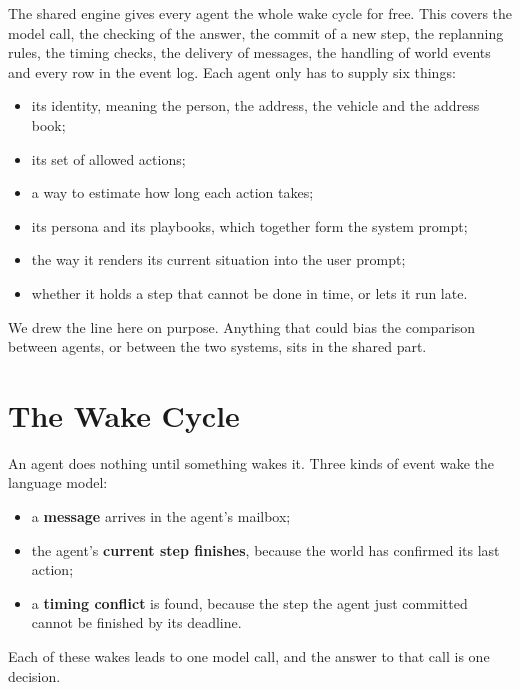 The shared engine gives every agent the whole wake cycle for free. This covers
the model call, the checking of the answer, the commit of a new step, the
replanning rules, the timing checks, the delivery of messages, the handling of
world events and every row in the event log. Each agent only has to supply six
things:
\begin{itemize}
  \item its identity, meaning the person, the address, the vehicle and the
  address book;
  \item its set of allowed actions;
  \item a way to estimate how long each action takes;
  \item its persona and its playbooks, which together form the system prompt;
  \item the way it renders its current situation into the user prompt;
  \item whether it holds a step that cannot be done in time, or lets it run
  late.
\end{itemize}
We drew the line here on purpose. Anything that could bias the comparison
between agents, or between the two systems, sits in the shared part.

\section{The Wake Cycle}
\label{sec:ag:engine}

An agent does nothing until something wakes it. Three kinds of event wake the
language model:
\begin{itemize}
  \item a \textbf{message} arrives in the agent's mailbox;
  \item the agent's \textbf{current step finishes}, because the world has
  confirmed its last action;
  \item a \textbf{timing conflict} is found, because the step the agent just
  committed cannot be finished by its deadline.
\end{itemize}
Each of these wakes leads to one model call, and the answer to that call is
one decision.


